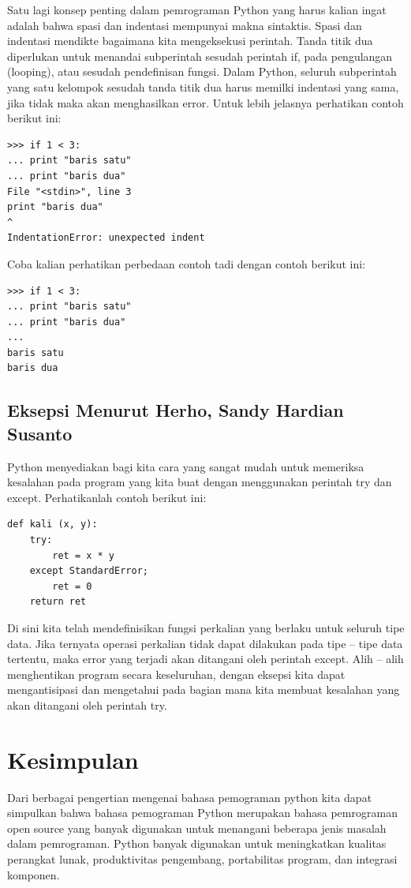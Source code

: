 \documentclass[12pt]{article}
\begin{document}
Satu lagi konsep penting dalam pemrograman Python yang harus kalian ingat adalah bahwa spasi dan indentasi mempunyai makna sintaktis. Spasi dan indentasi mendikte bagaimana kita mengeksekusi perintah. Tanda titik dua diperlukan untuk menandai subperintah sesudah perintah if, pada pengulangan (looping), atau sesudah pendefinisan fungsi. Dalam Python, seluruh subperintah yang satu kelompok sesudah tanda titik dua harus memilki indentasi yang sama, jika tidak maka akan menghasilkan error. Untuk lebih jelasnya perhatikan contoh berikut ini:

\begin{verbatim}
>>> if 1 < 3:
... print "baris satu"
... print "baris dua"
File "<stdin>", line 3
print "baris dua"
^
IndentationError: unexpected indent
\end{verbatim}

Coba kalian perhatikan perbedaan contoh tadi dengan contoh berikut ini:

\begin{verbatim}
>>> if 1 < 3:
... print "baris satu"
... print "baris dua"
...
baris satu
baris dua
\end{verbatim}

\subsection{Eksepsi Menurut Herho, Sandy Hardian Susanto}
Python menyediakan bagi kita cara yang sangat mudah untuk memeriksa kesalahan pada program yang kita buat dengan menggunakan perintah try dan except. Perhatikanlah contoh berikut ini:
\begin{verbatim}
def kali (x, y):
	try:
		ret = x * y
	except StandardError;
		ret = 0
	return ret
\end{verbatim}
Di sini kita telah mendefinisikan fungsi perkalian yang berlaku untuk seluruh tipe data. Jika ternyata operasi perkalian tidak dapat dilakukan pada tipe – tipe data tertentu, maka error yang terjadi akan ditangani oleh perintah except. Alih – alih menghentikan program secara keseluruhan, dengan eksepsi kita dapat mengantisipasi dan mengetahui pada bagian mana kita membuat kesalahan yang akan ditangani oleh perintah try\cite{herho2018tutorial}.


\section{Kesimpulan}
	Dari berbagai pengertian mengenai bahasa pemograman python kita dapat simpulkan bahwa bahasa pemograman Python merupakan bahasa pemrograman open source yang banyak digunakan untuk menangani beberapa jenis masalah dalam pemrograman. Python banyak digunakan untuk meningkatkan kualitas perangkat lunak, produktivitas pengembang, portabilitas program, dan integrasi komponen\cite{computingaplikasi}.
	
\end{document}
